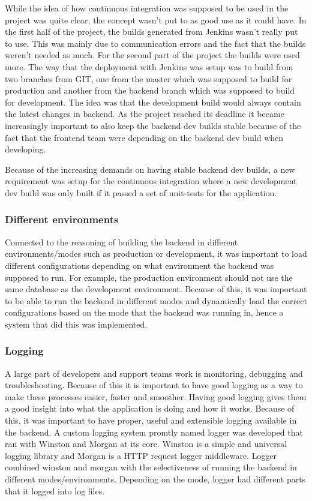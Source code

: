 While the idea of how continuous integration was supposed to be used in the project was quite clear, the concept wasn't put to as good use as it could have. In the first half of the project, the builds generated from Jenkins wasn't really put to use. This was mainly due to communication errors and the fact that the builds weren't needed as much. For the second part of the project the builds were used more. The way that the deployment with Jenkins was setup was to build from two branches from GIT, one from the master which was supposed to build for production and another from the backend branch which was supposed to build for development. The idea was that the development build would always contain the latest changes in backend. As the project reached its deadline it became increasingly important to also keep the backend dev builds stable because of the fact that the frontend team were depending on the backend dev build when developing.

Because of the increasing demands on having stable backend dev builds, a new requirement was setup for the continuous integration where a new development dev build was only built if it passed a set of unit-tests for the application.

\subsubsection{Different environments}
Connected to the reasoning of building the backend in different environments/modes such as production or development, it was important to load different configurations depending on what environment the backend was supposed to run. For example, the production environment should not use the same database as the development environment. Because of this, it was important to be able to run the backend in different modes and dynamically load the correct configurations based on the mode that the backend was running in, hence a system that did this was implemented.

\subsubsection{Logging}
A large part of developers and support teams work is monitoring, debugging and troubleshooting. Because of this it is important to have good logging as a way to make these processes easier, faster and smoother. Having good logging gives them a good insight into what the application is doing and how it works. Because of this, it was important to have proper, useful and extensible logging available in the backend. A custom logging system promtly named logger was developed that ran with Winston and Morgan at its core. Winston is a simple and universal logging library and Morgan is a HTTP request logger middleware. Logger combined winston and morgan with the selectiveness of running the backend in different modes/environments. Depending on the mode, logger had different parts that it logged into log files.

